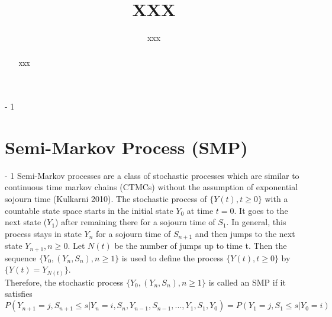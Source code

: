 \documentclass[12pt,letterpaper]{article}
\newcommand{\MyTabs}{ \hspace*{15.mm} \= ... \kill }
\begin{document}
\renewcommand{\refname}{REFERENCES}

\title{XXX}

\author {xxx}%

\date{}

\maketitle

\begin{abstract}
\noindent{}
xxx
\end{abstract}



\looseness - 1


\section*{Semi-Markov Process (SMP)}\label{sec:Semi Markov Process (SMP)}
\looseness - 1
Semi-Markov processes are a class of stochastic processes which are similar to continuous time markov chains (CTMCs) without the assumption of exponential sojourn time (Kulkarni 2010). The stochastic process of $\{Y(t), t\ge 0\}$ with a countable state space starts in the initial state $Y_0$ at time $t=0$. It goes to the next state ($Y_1$) after remaining there for a sojourn time of $S_1$. In general, this process stays in state $Y_n$ for a sojourn time of $S_{n+1}$ and then jumps to the next state $Y_{n+1}, n\ge 0$. Let $N(t)$ be the number of jumps up to time t. Then the sequence  $\{Y_0, (Y_n, S_n), n\ge 1\}$ is used to define the process $\{Y(t), t\ge 0\}$ by $\{Y(t)=Y_{N(t)}\}$.\\
Therefore, the stochastic process $\{Y_0, (Y_n, S_n), n\ge 1\}$ is called an SMP if it satisfies 
\begin{equation}
P(Y_{n+1}=j, S_{n+1}\le s |Y_n=i, S_n, Y_{n-1}, S_{n-1},..., Y_1, S_1, Y_0)
=P(Y_1=j, S_1\le s |Y_0=i)
\end{equation}
\end{document}
